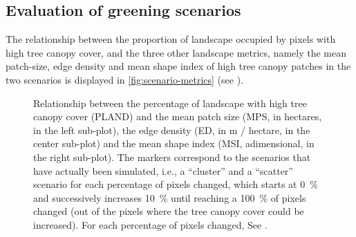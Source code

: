 \documentclass[10pt,letterpaper]{article}
\begin{document}


\subsection*{Evaluation of greening scenarios}

The relationship between the proportion of landscape occupied by pixels with high tree canopy cover, and the three other landscape metrics, namely the mean patch-size, edge density and mean shape index of high tree canopy patches in the two scenarios is displayed in \autoref{fig:scenario-metrics} (see ).

\begin{figure}[ht]
  \begin{adjustwidth}{-.4\textwidth}{0cm}
    \centering
    \caption{\label{fig:scenario-metrics} Relationship between the percentage of landscape with high tree canopy cover (PLAND) and the mean patch size (MPS, in hectares, in the left sub-plot), the edge density (ED, in m / hectare, in the center sub-plot) and the mean shape index (MSI, adimensional, in the right sub-plot). The markers correspond to the scenarios that have actually been simulated, i.e., a ``cluster'' and a ``scatter'' scenario for each percentage of pixels changed, which starts at 0~\% and successively increases 10~\% until reaching a 100~\% of pixels changed (out of the pixels where the tree canopy cover could be increased). For each percentage of pixels changed, See .}
  \end{adjustwidth}
\end{figure}
\end{document}
